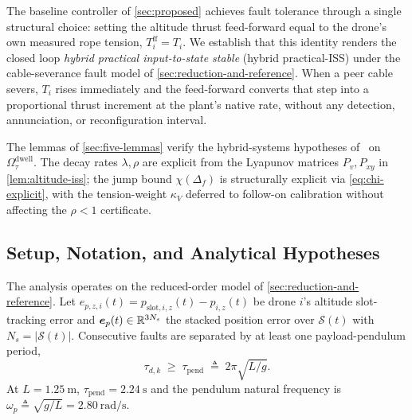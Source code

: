 
The baseline controller of \cref{sec:proposed} achieves fault
tolerance through a single structural choice: setting the altitude
thrust feed-forward equal to the drone's own measured rope tension,
$T_i^{\mathrm{ff}} = T_i$. We establish that this identity renders
the closed loop \emph{hybrid practical input-to-state stable}
(hybrid practical-ISS) under the cable-severance fault model of
\cref{sec:reduction-and-reference}. When a peer cable severs,
$T_i$ rises immediately and the feed-forward converts that step
into a proportional thrust increment at the plant's native rate,
without any detection, annunciation, or reconfiguration interval.

The lemmas of \cref{sec:five-lemmas} verify the hybrid-systems hypotheses of~\cite{GoebelSanfeliceTeel2012} on $\Omega_\tau^{\mathrm{dwell}}$. The decay rates $\lambda,\rho$ are explicit from the Lyapunov matrices $P_v,P_{xy}$ in \cref{lem:altitude-iss}; the jump bound $\chi(\Delta_f)$ is structurally explicit via \eqref{eq:chi-explicit}, with the tension-weight $\kappa_V$ deferred to follow-on calibration without affecting the $\rho<1$ certificate.

\subsection{Setup, Notation, and Analytical Hypotheses}
\label{sec:stability-setup}

The analysis operates on the reduced-order model of
\cref{sec:reduction-and-reference}. Let
$e_{p,z,i}(t) = p_{\mathrm{slot},i,z}(t) - p_{i,z}(t)$ be
drone $i$'s altitude slot-tracking error and
$\boldsymbol{e}_p(t) \in \mathbb{R}^{3N_s}$ the stacked position error over
$\mathcal{S}(t)$ with $N_s = |\mathcal{S}(t)|$. Consecutive faults are separated by at least one
payload-pendulum period,
\begin{equation}
  \tau_{d,k} \;\ge\; \tau_{\mathrm{pend}}
    \;\triangleq\; 2\pi\sqrt{L/g}.
  \label{eq:dwell-condition}
\end{equation}
At $L = \SI{1.25}{\metre}$, $\tau_{\mathrm{pend}} =
\SI{2.24}{\second}$ and the pendulum natural frequency is
$\omega_p \triangleq \sqrt{g/L} = \SI{2.80}{\radian\per\second}$.

